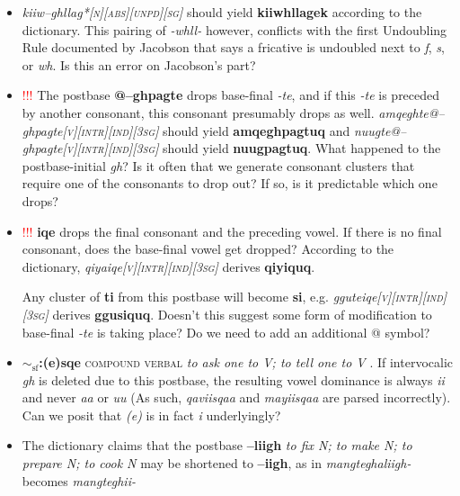 \documentclass{article}
\begin{document}
\begin{itemize}
\item \textit{kiiw--ghllag*\textsc{[n][abs][unpd][sg]}} should yield \textbf{kiiwhllagek} according to the dictionary. This pairing of \textit{-whll-} however, conflicts with the first Undoubling Rule documented by Jacobson that says a fricative is undoubled next to \textit{f}, \textit{s}, or \textit{wh}. Is this an error on Jacobson's part?

\item \textcolor{red}{!!!} The postbase \textbf{@--ghpagte} drops base-final \textit{-te}, and if this \textit{-te} is preceded by another consonant, this consonant presumably drops as well. \textit{amqeghte@--ghpagte\textsc{[v][intr][ind][3sg]}} should yield \textbf{amqeghpagtuq} and \textit{nuugte@--ghpagte\textsc{[v][intr][ind][3sg]}} should yield \textbf{nuugpagtuq}. What happened to the postbase-initial \textit{gh}? Is it often that we generate consonant clusters that require one of the consonants to drop out? If so, is it predictable which one drops?

\item \textcolor{red}{!!!} \textbf{\textendash \textendash iqe} drops the final consonant and the preceding vowel. If there is no final consonant, does the base-final vowel get dropped? According to the dictionary, \textit{qiya\textendash \textendash iqe\textsc{[v][intr][ind][3sg]}} derives \textbf{qiyiquq}.

Any cluster of \textbf{ti} from this postbase will become \textbf{si}, e.g. \textit{ggute\textendash \textendash iqe\textsc{[v][intr][ind][3sg]}} derives \textbf{ggusiquq}. Doesn't this suggest some form of modification to base-final \textit{-te} is taking place? Do we need to add an additional @ symbol?

\item \textbf{$\sim_\text{sf}$:(e)sqe} \textsc{compound verbal} \textit{to ask one to V; to tell one to V} . If intervocalic \textit{gh} is deleted due to this postbase, the resulting vowel dominance is always \textit{ii} and never \textit{aa} or \textit{uu} (As such, \textit{qaviisqaa} and \textit{mayiisqaa} are parsed incorrectly). Can we posit that \textit{(e)} is in fact \textit{i} underlyingly?

\item The dictionary claims that the postbase \textbf{--liigh} \textit{to fix N; to make N; to prepare N; to cook N} may be shortened to \textbf{--iigh}, as in \textit{mangteghaliigh-} becomes \textit{mangteghii-}


\end{itemize}
\end{document}
